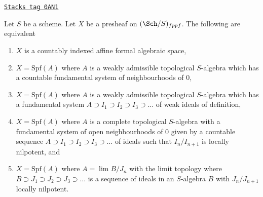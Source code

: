\begin{lemma}
\label{formal-spaces-lemma-countably-indexed}
\href{https://stacks.math.columbia.edu/tag/0AN1}{\texttt{Stacks tag 0AN1}}

Let $S$ be a scheme. Let $X$ be a presheaf on $(\Sch/S)_{fppf}$.
The following are equivalent
\begin{enumerate}
\item $X$ is a countably indexed affine formal algebraic space,
\item $X = \text{Spf}(A)$ where $A$ is a weakly admissible topological
$S$-algebra which has a countable fundamental system of neighbourhoods of $0$,
\item $X = \text{Spf}(A)$ where $A$ is a weakly admissible topological
$S$-algebra which has a fundamental system
$A \supset I_1 \supset I_2 \supset I_3 \supset \ldots$
of weak ideals of definition,
\item $X = \text{Spf}(A)$ where $A$ is a complete topological $S$-algebra
with a fundamental system of open neighbourhoods of $0$ given by a
countable sequence $A \supset I_1 \supset I_2 \supset I_3 \supset \ldots$
of ideals such that $I_n/I_{n + 1}$ is locally nilpotent, and
\item $X = \text{Spf}(A)$ where $A = \lim B/J_n$ with the limit topology
where $B \supset J_1 \supset J_2 \supset J_3 \supset \ldots$ is a
sequence of ideals in an $S$-algebra $B$ with $J_n/J_{n + 1}$
locally nilpotent.
\end{enumerate}
\end{lemma}

